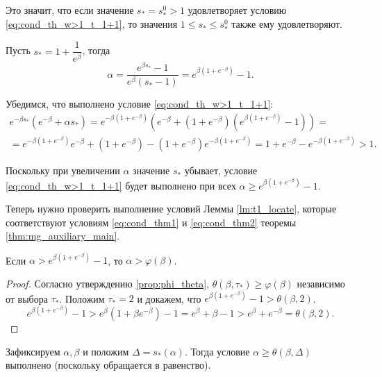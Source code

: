 Это значит, что если значение $s_* =  s_*^0 > 1$ удовлетворяет условию \eqref{eq:cond_th_w>1_t_1+1}, то значения $1 \leqslant  s_* \leqslant s_*^0$ также ему удовлетворяют.

Пусть $s_* = 1 + \dfrac{1}{e^{\beta}}$, тогда
\begin{equation}
	\alpha = \frac{e^{\beta s_*} - 1}{e^{\beta}(s_* - 1)} = e^{\beta(1 + e^{-\beta})} - 1.
\end{equation}

Убедимся, что выполнено условие \eqref{eq:cond_th_w>1_t_1+1}:
\begin{multline}
	e^{-\beta s_*}(e^{-\beta} + \alpha s_*) =
	e^{-\beta (1 + e^{-\beta})}\left(e^{-\beta} + (1 + e^{-\beta})(e^{\beta(1 + e^{-\beta})} - 1)\right) =\\
	= e^{-\beta (1 + e^{-\beta})} e^{-\beta} + (1 + e^{-\beta}) - (1 + e^{-\beta})e^{-\beta (1 + e^{-\beta})} = 1 + e^{-\beta} - e^{-\beta (1 + e^{-\beta})} > 1.
\end{multline}

Поскольку при увеличении $\alpha$ значение $s_*$ убывает, условие \eqref{eq:cond_th_w>1_t_1+1} будет выполнено при всех $\alpha \geqslant e^{\beta(1 + e^{-\beta})} - 1$.

Теперь нужно проверить выполнение условий Леммы \ref{lm:t1_locate}, которые соответствуют условиям \eqref{eq:cond_thm1} и \eqref{eq:cond_thm2} теоремы \ref{thm:mg_auxiliary_main}.

\begin{proposition}
	\label{prop:alpha_greater_phi}
	Если $\alpha > e^{\beta(1 + e^{-\beta})} - 1$, то $\alpha > \varphi(\beta)$.
\end{proposition}
\begin{proof}
	Согласно утверждению \ref{prop:phi_theta}, $\theta(\beta, \tau_*) \geqslant \varphi(\beta)$ независимо от выбора $\tau_*$. Положим $\tau_* = 2$ и докажем, что $e^{\beta(1 + e^{-\beta})} - 1 > \theta(\beta, 2)$.
	\[
	e^{\beta(1 + e^{-\beta})} - 1 >
	e^{\beta} (1 + \beta e^{-\beta}) - 1 =
	e^{\beta} + \beta - 1 > e^{\beta} + e^{-\beta} = \theta(\beta, 2).
	\]
\end{proof}

Зафиксируем $\alpha, \beta$ и положим $\Delta =  s_*(\alpha)$. Тогда условие $\alpha \geqslant \theta(\beta, \Delta)$ выполнено (поскольку обращается в равенство).


